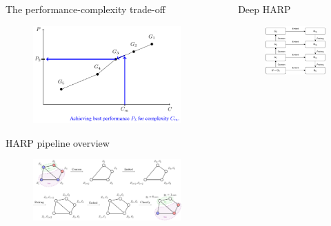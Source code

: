 \documentclass{beamer}
\newlength{\sepwidth}
\newlength{\colwidth}
\newcommand{\separatorcolumn}{\begin{column}{\sepwidth}\end{column}}
\begin{document}
\begin{frame}[t]
\begin{columns}[t]
\begin{column}{\colwidth}
		\begin{block}{The performance-complexity trade-off}
			\begin{figure}
				\includegraphics[width=\linewidth]{images/performance-complexity/performance-complexity.pdf}
			\end{figure}
		\end{block}

		\begin{block}{HARP pipeline overview}
			\begin{figure}
				\includegraphics[width=\linewidth]{images/harp-overview/harp-overview.pdf}
			\end{figure}
		\end{block}
	\end{column}

	\separatorcolumn

	\begin{column}{\colwidth}
		\begin{block}{Deep HARP}
			\begin{figure}
				\includegraphics[width=0.5\linewidth]{images/deep-harp/deep-harp.pdf}
			\end{figure}
		\end{block}


\end{column}
\end{columns}
\end{frame}
\end{document}
